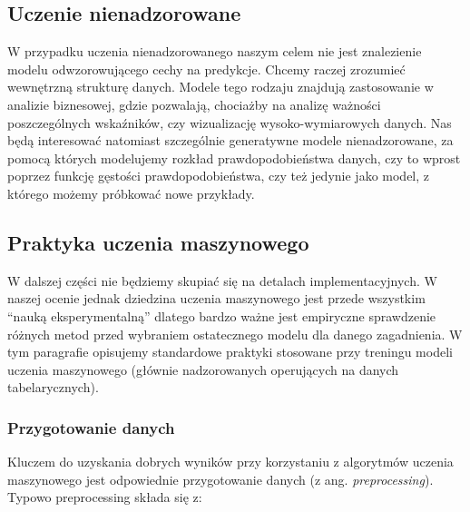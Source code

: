 \documentclass{myclass}
\numberwithin{equation}{section}
\begin{document}
\subsection{Uczenie nienadzorowane}

W przypadku uczenia nienadzorowanego naszym celem nie jest znalezienie modelu odwzorowującego cechy
na predykcje. Chcemy raczej zrozumieć wewnętrzną strukturę danych. Modele tego rodzaju znajdują
zastosowanie w analizie biznesowej, gdzie pozwalają, chociażby na analizę ważności poszczególnych
wskaźników, czy wizualizację wysoko-wymiarowych danych. Nas będą interesować natomiast szczególnie
generatywne modele nienadzorowane, za pomocą których modelujemy rozkład prawdopodobieństwa danych,
czy to wprost poprzez funkcję gęstości prawdopodobieństwa, czy też jedynie jako model, z którego
możemy próbkować nowe przykłady.


\subsection{Praktyka uczenia maszynowego}

W dalszej części nie będziemy skupiać się na detalach implementacyjnych. W naszej ocenie jednak
dziedzina uczenia maszynowego jest przede wszystkim \enquote{nauką eksperymentalną} dlatego bardzo
ważne jest empiryczne sprawdzenie różnych metod przed wybraniem ostatecznego modelu dla danego
zagadnienia. W tym paragrafie opisujemy standardowe praktyki stosowane przy treningu modeli uczenia
maszynowego (głównie nadzorowanych operujących na danych tabelarycznych).


\subsubsection{Przygotowanie danych}

Kluczem do uzyskania dobrych wyników przy korzystaniu z algorytmów uczenia maszynowego jest
odpowiednie przygotowanie danych (z ang. \textit{preprocessing}). Typowo preprocessing składa się z:
\end{document}
